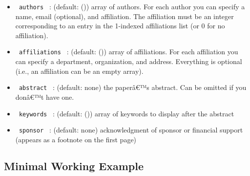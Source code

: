 \begin{itemize}
\tightlist
\item
  \texttt{\ authors\ } : (default: ()) array of authors. For each author
  you can specify a name, email (optional), and affiliation. The
  affiliation must be an integer corresponding to an entry in the
  1-indexed affiliations list (or 0 for no affiliation).
\item
  \texttt{\ affiliations\ } : (default: ()) array of affiliations. For
  each affiliation you can specify a department, organization, and
  address. Everything is optional (i.e., an affiliation can be an empty
  array).
\item
  \texttt{\ abstract\ } : (default: none) the paperâ€™s abstract. Can be
  omitted if you donâ€™t have one.
\item
  \texttt{\ keywords\ } : (default: ()) array of keywords to display
  after the abstract
\item
  \texttt{\ sponsor\ } : (default: none) acknowledgment of sponsor or
  financial support (appears as a footnote on the first page)
\end{itemize}

\subsection{Minimal Working Example}\label{minimal-working-example}

\begin{Shaded}
\begin{Highlighting}[]
\NormalTok{    (}
\NormalTok{    ),}
\NormalTok{  ),}
\NormalTok{    (}
\NormalTok{    ),}
\NormalTok{  ),}
\NormalTok{  abstract: [}
\NormalTok{  ],}
\NormalTok{  sponsor: [}
\NormalTok{  ],}
\NormalTok{)}





\end{Highlighting}
\end{Shaded}

